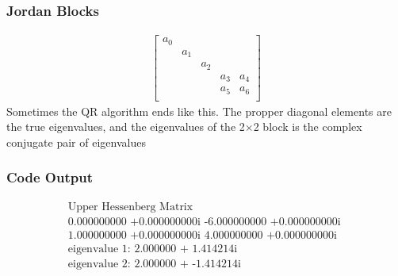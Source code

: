 \documentclass{beamer}
\theoremstyle{remark}
\numberwithin{equation}{section}
\begin{document}
\begin{frame}
  \frametitle{Jordan Blocks}
  \begin{align}
    \begin{bmatrix}
        a_0 & & & &  \\
         & a_1 & & &  \\
         & & a_2 & & \\
         & &  & a_3 &a_4\\
         & & & a_5& a_6\\
    \end{bmatrix}
\end{align}
Sometimes the QR algorithm ends like this. The propper diagonal elements are the true eigenvalues, and the eigenvalues of the 2$\times$2 block is the complex conjugate pair of eigenvalues
\end{frame}
\begin{frame}
  \frametitle{Code Output}
  \begin{align}
  \text{Upper Hessenberg Matrix}\\
  \text{0.000000000 +0.000000000i -6.000000000 +0.000000000i }\\
  \text{1.000000000 +0.000000000i 4.000000000 +0.000000000i }\\
  \text{eigenvalue 1: 2.000000 + 1.414214i}\\
  \text{eigenvalue 2: 2.000000 + -1.414214i}\\
  \end{align}
 \end{frame}
\end{document}
